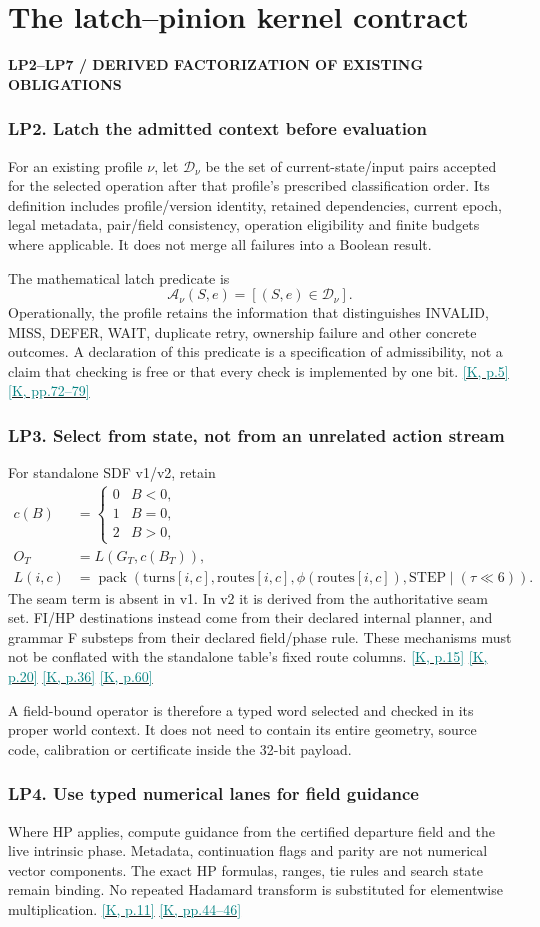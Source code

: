 \documentclass[11pt,a4paper]{article}
\newcommand{\kref}[1]{\hyperlink{baseline.#1}{\textcolor{teal}{[K, p.#1]}}}
\newcommand{\krange}[2]{\hyperlink{baseline.#1}{\textcolor{teal}{[K, pp.#1--#2]}}}
\newcommand{\status}[1]{{\sffamily\bfseries\scriptsize\color{teal}#1}\par}
\newcommand{\req}[2]{\subsubsection{#1. #2}}
\newcommand{\sectionstart}[1]{\par\addvspace{18pt}\Needspace{12\baselineskip}\section{#1}}
\theoremstyle{lpstyle}
\newcommand{\Latch}{\mathcal A}
\begin{document}
\sectionstart{The latch--pinion kernel contract}
\status{LP2--LP7 / DERIVED FACTORIZATION OF EXISTING OBLIGATIONS}
\req{LP2}{Latch the admitted context before evaluation}
For an existing profile $\nu$, let $\mathcal D_\nu$ be the set of current-state/input pairs accepted for the selected operation after that profile's prescribed classification order. Its definition includes profile/version identity, retained dependencies, current epoch, legal metadata, pair/field consistency, operation eligibility and finite budgets where applicable. It does not merge all failures into a Boolean result.

The mathematical latch predicate is
\[
\Latch_\nu(S,e)=[(S,e)\in\mathcal D_\nu].
\]
Operationally, the profile retains the information that distinguishes INVALID, MISS, DEFER, WAIT, duplicate retry, ownership failure and other concrete outcomes. A declaration of this predicate is a specification of admissibility, not a claim that checking is free or that every check is implemented by one bit. \kref{5} \krange{72}{79}

\req{LP3}{Select from state, not from an unrelated action stream}
For standalone SDF v1/v2, retain
\begin{align*}
c(B)&=\begin{cases}0&B<0,\\1&B=0,\\2&B>0,\end{cases}\\
O_T&=L(G_T,c(B_T)),\\
L(i,c)&=\operatorname{pack}(\mathrm{turns}[i,c],\mathrm{routes}[i,c],
\phi(\mathrm{routes}[i,c]),\mathrm{STEP}\mid(\tau\ll6)).
\end{align*}
The seam term is absent in v1. In v2 it is derived from the authoritative seam set. FI/HP destinations instead come from their declared internal planner, and grammar F substeps from their declared field/phase rule. These mechanisms must not be conflated with the standalone table's fixed route columns. \kref{15} \kref{20} \kref{36} \kref{60}

A field-bound operator is therefore a typed word selected and checked in its proper world context. It does not need to contain its entire geometry, source code, calibration or certificate inside the 32-bit payload.

\req{LP4}{Use typed numerical lanes for field guidance}
Where HP applies, compute guidance from the certified departure field and the live intrinsic phase. Metadata, continuation flags and parity are not numerical vector components. The exact HP formulas, ranges, tie rules and search state remain binding. No repeated Hadamard transform is substituted for elementwise multiplication. \kref{11} \krange{44}{46}
\end{document}

